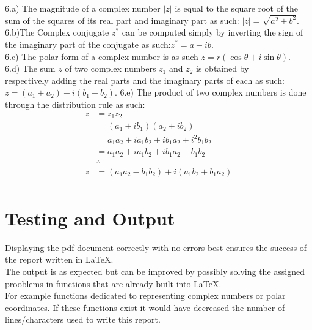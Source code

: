 \documentclass[letterpaper, 24pt, final, onecolumn, titlepage] {article}
\begin{document}
6.a) The magnitude of a complex number $|z|$ is equal to the square root of the sum of the squares of its real part and imaginary part as such: $|z| = \sqrt{a^2 + b^2}$.\\
6.b)The Complex conjugate $z^*$ can be computed simply by inverting the sign of the imaginary part of the conjugate as such:$z^* = a - ib$.\\
6.c) The polar form of a complex number is as such $z= r( \cos\theta + i\sin\theta)$. \\
6.d) The sum $z$ of two complex numbers $z_1$ and $z_2$ is obtained by \\respectively adding the real parts and the imaginary parts of each as such: $z= (a_1 +a_2) + i(b_1 +b_2)$.
6.e) The product of two complex numbers is done through the distribution rule as such:
\begin{align*}
z &= z_1z_2\\
&= (a_1 +ib_1)(a_2 + ib_2)\\
&= a_1a_2 + ia_1b_2 + ib_1a_2 + i^2b_1b_2\\
&= a_1a_2 + ia_1b_2 + ib_1a_2 - b_1b_2\\
& \therefore\\
z &= ( a_1a_2 - b_1b_2) + i(a_1b_2 + b_1a_2)\\
\end{align*}

\pagebreak

\section{Testing and Output}
Displaying the pdf document correctly with no errors best ensures the success of the report written in \LaTeX.\\
The output is as expected but can be improved by possibly solving the assigned prooblems in functions that are already built into \LaTeX.\\
For example functions dedicated to representing complex numbers or polar coordinates. If these functions exist it would have decreased the number of lines/characters used to write this report.

\pagebreak
\end{document}
